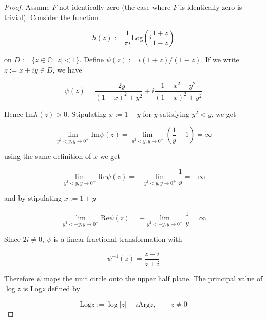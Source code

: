 \begin{proof}
	Assume $F$ not identically zero (the case where $F$ is identically zero is trivial). Consider the function 

	\begin{equation}
		h(z) := \frac{1}{\pi i}\mathrm{Log}\left( i\frac{1 + z}{1 - z} \right)
	\end{equation}

	on $D := \{z \in \mathbb{C} : \vert z \vert < 1\}$. Define $\psi(z) := i(1 + z)/(1 - z)$. If we write $z := x + iy \in D$, we have 

	\begin{equation}
		\psi(z) = \frac{-2y}{(1 - x)^2 + y^2} + i \frac{1 - x^2 - y^2}{(1 - x)^2 + y^2}
	\end{equation}

	Hence $\mathrm{Im} h(z) > 0$. Stipulating $x := 1 - y$ for $y$ satisfying $y^2 < y$, we get

	\begin{equation}
		\lim\limits_{y^2 < y, y \rightarrow 0^+} \mathrm{Im} \psi(z) = \lim\limits_{y^2 < y, y \rightarrow 0^+} \left( \frac{1}{y} - 1 \right) = \infty
	\end{equation}

	using the same definition of $x$ we get

	\begin{equation}
		\lim\limits_{y^2 < y, y \rightarrow 0^+} \mathrm{Re} \psi(z) = -\lim\limits_{y^2 < y, y \rightarrow 0^+} \frac{1}{y} = -\infty
	\end{equation}

	and by stipulating $x := 1 + y$

	\begin{equation}
		\lim\limits_{y^2 < -y, y \rightarrow 0^-} \mathrm{Re} \psi(z) = -\lim\limits_{y^2 < -y, y \rightarrow 0^-} \frac{1}{y} = \infty	
	\end{equation}


	Since $2i \neq 0$, $\psi$ is a linear fractional transformation with

	\begin{equation}
		\psi^{-1}(z) = \frac{z - i}{z + i}
	\end{equation}

	Therefore $\psi$ maps the unit circle onto the upper half plane. The principal value of $\log z$ is $\mathrm{Log} z$ defined by 

	\begin{equation}
		\mathrm{Log}z := \log \vert z \vert + i \mathrm{Arg}z, \qquad z \neq 0
	\end{equation}


\end{proof}
